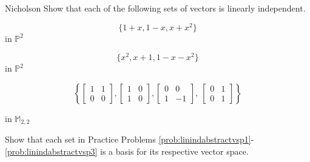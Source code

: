 \documentclass{ximera}
\begin{document}
\begin{problem}
{\color{red}Nicholson} Show that each of the following sets of vectors is linearly independent.

\begin{problem}\label{prob:linindabstractvsp1}
$$\{1 + x, 1 - x, x + x^{2}\}$$ in $\mathbb{P}^{2}$
\end{problem}

\begin{problem}\label{prob:linindabstractvsp2}
$$\{x^{2}, x + 1, 1 - x - x^{2}\}$$ in $\mathbb{P}^{2}$
\end{problem}

\begin{problem}\label{prob:linindabstractvsp3}
$$
\left\{
\begin{bmatrix}
1 & 1 \\
0 & 0
\end{bmatrix}
, 
\begin{bmatrix}
1 & 0 \\
1 & 0
\end{bmatrix}
, 
\begin{bmatrix}
0 & 0 \\
1 & -1
\end{bmatrix}
,\
\begin{bmatrix}
0 & 1 \\
0 & 1
\end{bmatrix}
\right\}$$ 

in $\mathbb{M}_{2,2}$
\end{problem}

\end{problem}

\begin{problem}\label{prob:linindabstractvsp123}
Show that each set in Practice Problems \ref{prob:linindabstractvsp1}-\ref{prob:linindabstractvsp3} is a basis for its respective vector space.
\end{problem}
\end{document}

